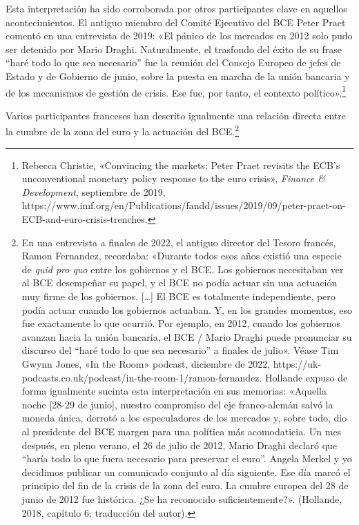 \documentclass[10pt,a4paper]{article}
\begin{document}
{Esta interpretación ha sido corroborada por otros participantes clave en aquellos acontecimientos. El antiguo miembro del Comité Ejecutivo del BCE Peter Praet comentó en una entrevista de 2019: «El pánico de los mercados en 2012 solo pudo ser detenido por Mario Draghi. Naturalmente, el trasfondo del éxito de su frase “haré todo lo que sea necesario” fue la reunión del Consejo Europeo de jefes de Estado y de Gobierno de junio, sobre la puesta en marcha de la unión bancaria y de los mecanismos de gestión de crisis. Ese fue, por tanto, el contexto político».\footnote{%
    Rebecca Christie, «Convincing the markets: Peter Praet revisits the ECB’s unconventional monetary policy response to the euro crisis», \textit{Finance & Development}, septiembre de 2019, https://www.imf.org/en/Publications/fandd/issues/2019/09/peter-praet-on-ECB-and-euro-crisis-trenches.
}

Varios participantes franceses han descrito igualmente una relación directa entre la cumbre de la zona del euro y la actuación del BCE.\footnote{
En una entrevista a finales de 2022, el antiguo director del Tesoro francés, Ramon Fernandez, recordaba: «Durante todos esos años existió una especie de \textit{quid pro quo} entre los gobiernos y el BCE. Los gobiernos necesitaban ver al BCE desempeñar su papel, y el BCE no podía actuar sin una actuación muy firme de los gobiernos. […] El BCE es totalmente independiente, pero podía actuar cuando los gobiernos actuaban. Y, en los grandes momentos, eso fue exactamente lo que ocurrió. Por ejemplo, en 2012, cuando los gobiernos avanzan hacia la unión bancaria, el BCE / Mario Draghi puede pronunciar su discurso del “haré todo lo que sea necesario” a finales de julio». Véase Tim Gwynn Jones, «In the Room» podcast, diciembre de 2022, https://uk-podcasts.co.uk/podcast/in-the-room-1/ramon-fernandez. Hollande expuso de forma igualmente sucinta esta interpretación en sus memorias: «Aquella noche [28-29 de junio], nuestro compromiso del eje franco-alemán salvó la moneda única, derrotó a los especuladores de los mercados y, sobre todo, dio al presidente del BCE margen para una política más acomodaticia. Un mes después, en pleno verano, el 26 de julio de 2012, Mario Draghi declaró que “haría todo lo que fuera necesario para preservar el euro”. Angela Merkel y yo decidimos publicar un comunicado conjunto al día siguiente. Ese día marcó el principio del fin de la crisis de la zona del euro. La cumbre europea del 28 de junio de 2012 fue histórica. ¿Se ha reconocido suficientemente?». (Hollande, 2018, capítulo 6; traducción del autor).
}

}
\end{document}
